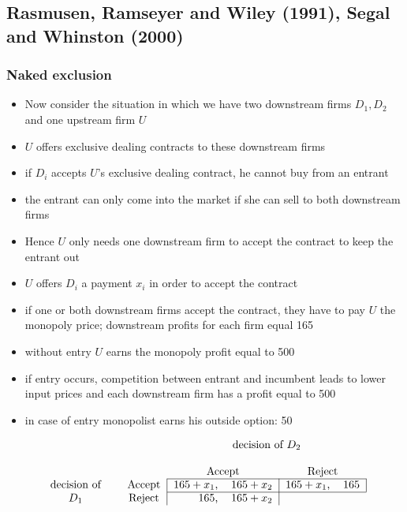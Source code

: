 \documentclass[11pt,english]{beamer}
\begin{document}
\subsection{Rasmusen, Ramseyer and Wiley (1991), Segal and Whinston (2000)}
\begin{frame}[allowframebreaks]\frametitle{Naked exclusion}
  \begin{itemize}
  \item Now consider the situation in which we have two downstream
    firms $D_1,D_2$ and one upstream firm $U$
  \item $U$ offers exclusive dealing contracts to these downstream
    firms
  \item if $D_i$ accepts $U$'s exclusive dealing contract, he cannot
    buy from an entrant
  \item the entrant can only come into the market if she can sell to
    both downstream firms
  \item Hence $U$ only needs one downstream firm to accept the
    contract to keep the entrant out
  \item $U$ offers $D_i$ a payment $x_i$ in order to accept the contract
  \item if one or both downstream firms accept the contract, they have
    to pay $U$ the monopoly price; downstream profits for each firm
    equal 165
  \item without entry $U$ earns the monopoly profit equal to 500
  \item if entry occurs, competition between entrant and incumbent
    leads to lower input prices and each downstream firm has a profit
    equal to 500
  \item in case of entry monopolist earns his outside option: 50
  \end{itemize}
  \begin{table}
    \begin{equation*}
      \begin{tabular}{ccccccc}
        &  &  & \multicolumn{4}{c}{decision of $D_2$} \\
        &  &  &  &  & & \\
        &  &  & \multicolumn{2}{c}{Accept} & \multicolumn{2}{c}{Reject} \\ \cline{4-7}
        decision of &  & Accept & \multicolumn{1}{|r}{$165+x_1$,} & \multicolumn{1}{l}{$165+x_2$} &
        \multicolumn{1}{|r}{$165+x_1$,} & \multicolumn{1}{l|}{$165$} \\ \cline{4-7}
        $D_1$ &  & Reject & \multicolumn{1}{|r}{$165$,} & \multicolumn{1}{l|}{$165+x_2$} &

\end{tabular}
\end{equation*}
\end{table}
\end{frame}
\end{document}
